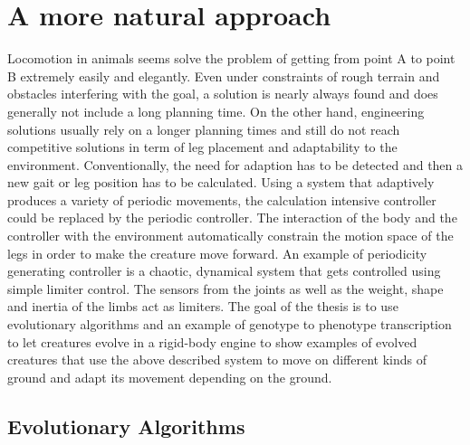 \documentclass[main]{subfiles}
\begin{document}
\lipsum[1]


\section{A more natural approach}

Locomotion in animals seems solve the problem of getting from point A to point B extremely easily and elegantly. Even under constraints of rough terrain and obstacles interfering with the goal, a solution is nearly always found and does generally not include a long planning time. On the other hand, engineering solutions usually rely on a longer planning times and still do not reach competitive solutions in term of leg placement and adaptability to the environment. Conventionally, the need for adaption has to be detected and then a new gait or leg position has to be calculated. Using a system that adaptively produces a variety of periodic movements, the calculation intensive controller could be replaced by the periodic controller. The interaction of the body and the controller with the environment automatically constrain the motion space of the legs in order to make the creature move forward. An example of periodicity generating controller is a chaotic, dynamical system that gets controlled using simple limiter control. The sensors from the joints as well as the weight, shape and inertia of the limbs act as limiters. The goal of the thesis is to use evolutionary algorithms and an example of genotype to phenotype transcription to let creatures evolve in a rigid-body engine to show examples of evolved creatures that use the above described system to move on different kinds of ground and adapt its movement depending on the ground.


\subsection{Evolutionary Algorithms}
\end{document}
